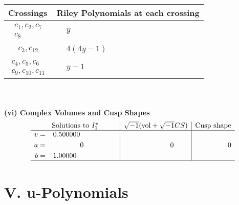\documentclass[1p]{elsarticle_modified}
\theoremstyle{definition}
\newcommand{\I}{\sqrt{-1}}
\begin{document}
\begin{tabular}{m{50pt}|m{274pt}}
Crossings & \hspace{64pt}Riley Polynomials at each crossing \\
\hline $$\begin{aligned}c_{1},c_{2},c_{7}\\c_{8}\end{aligned}$$&$\begin{aligned}
&y
\end{aligned}$\\
\hline $$\begin{aligned}c_{3},c_{12}\end{aligned}$$&$\begin{aligned}
&4(4 y-1)
\end{aligned}$\\
\hline $$\begin{aligned}c_{4},c_{5},c_{6}\\c_{9},c_{10},c_{11}\end{aligned}$$&$\begin{aligned}
&y-1
\end{aligned}$\\
\hline
\end{tabular}\\~\\
\newpage\flushleft \textbf{(vi) Complex Volumes and Cusp Shapes}
$$\begin{array}{c|c|c}  
\text{Solutions to }I^v_{1}& \I (\text{vol} + \sqrt{-1}CS) & \text{Cusp shape}\\
 \hline 
\begin{aligned}
v &= \phantom{-}0.500000\phantom{ +0.000000I} \\
a &= \phantom{-0.000000 } 0 \\
b &= \phantom{-}1.00000\phantom{ +0.000000I}\end{aligned}
 & \phantom{-0.000000 } 0 & \phantom{-0.000000 } 0\\
 \hline 
 \end{array}$$\newpage
\newpage\renewcommand{\arraystretch}{1}
\centering \section*{ V. u-Polynomials}
\end{document}
